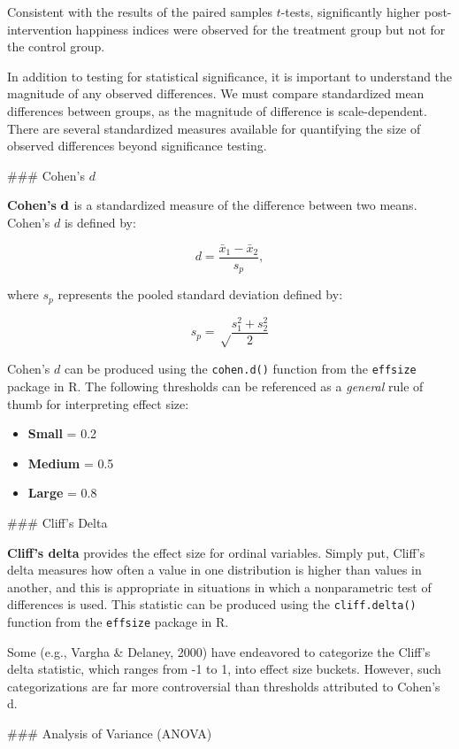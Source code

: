 \documentclass[]{book}
\providecommand{\tightlist}{%
  \setlength{\itemsep}{0pt}\setlength{\parskip}{0pt}}
\begin{document}
Consistent with the results of the paired samples \(t\)-tests, significantly higher post-intervention happiness indices were observed for the treatment group but not for the control group.

In addition to testing for statistical significance, it is important to understand the magnitude of any observed differences. We must compare standardized mean differences between groups, as the magnitude of difference is scale-dependent. There are several standardized measures available for quantifying the size of observed differences beyond significance testing.

\#\#\# Cohen's \(d\)

\textbf{Cohen's} \(\textbf d\) is a standardized measure of the difference between two means. Cohen's \(d\) is defined by:

\[ d = \frac{\bar{x}_1 - \bar{x}_2} {s_p},  \]

where \(s_p\) represents the pooled standard deviation defined by:

\[ s_p = \sqrt\frac{s^2_1 + s^2_2}{2} \]

Cohen's \(d\) can be produced using the \texttt{cohen.d()} function from the \texttt{effsize} package in R. The following thresholds can be referenced as a \emph{general} rule of thumb for interpreting effect size:

\begin{itemize}
\tightlist
\item
  \textbf{Small} = 0.2
\item
  \textbf{Medium} = 0.5
\item
  \textbf{Large} = 0.8
\end{itemize}

\#\#\# Cliff's Delta

\textbf{Cliff's delta} provides the effect size for ordinal variables. Simply put, Cliff's delta measures how often a value in one distribution is higher than values in another, and this is appropriate in situations in which a nonparametric test of differences is used. This statistic can be produced using the \texttt{cliff.delta()} function from the \texttt{effsize} package in R.

Some (e.g., Vargha \& Delaney, 2000) have endeavored to categorize the Cliff's delta statistic, which ranges from -1 to 1, into effect size buckets. However, such categorizations are far more controversial than thresholds attributed to Cohen's d.

\#\#\# Analysis of Variance (ANOVA)
\end{document}
